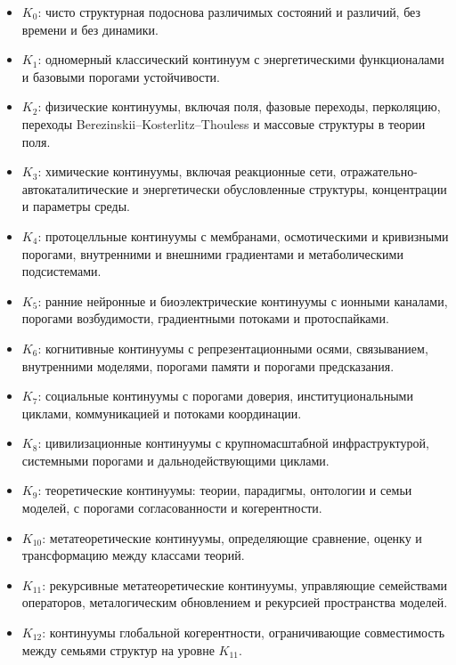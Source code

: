 \begin{itemize}
    \item \(K_0\): чисто структурная подоснова различимых состояний и различий, без времени и без динамики.
    \item \(K_1\): одномерный классический континуум с энергетическими функционалами и базовыми порогами устойчивости.
    \item \(K_2\): физические континуумы, включая поля, фазовые переходы, перколяцию,
          переходы Berezinskii--Kosterlitz--Thouless и массовые структуры в теории поля.
    \item \(K_3\): химические континуумы, включая реакционные сети, отражательно-автокаталитические
          и энергетически обусловленные структуры, концентрации и параметры среды.
    \item \(K_4\): протоцелльные континуумы с мембранами, осмотическими и кривизными порогами,
          внутренними и внешними градиентами и метаболическими подсистемами.
    \item \(K_5\): ранние нейронные и биоэлектрические континуумы с ионными каналами,
          порогами возбудимости, градиентными потоками и протоспайками.
    \item \(K_6\): когнитивные континуумы с репрезентационными осями, связыванием,
          внутренними моделями, порогами памяти и порогами предсказания.
    \item \(K_7\): социальные континуумы с порогами доверия, институциональными циклами,
          коммуникацией и потоками координации.
    \item \(K_8\): цивилизационные континуумы с крупномасштабной инфраструктурой,
          системными порогами и дальнодействующими циклами.
    \item \(K_9\): теоретические континуумы: теории, парадигмы, онтологии и семьи моделей,
          с порогами согласованности и когерентности.
    \item \(K_{10}\): метатеоретические континуумы, определяющие сравнение, оценку и трансформацию между классами теорий.
    \item \(K_{11}\): рекурсивные метатеоретические континуумы, управляющие семействами операторов,
          металогическим обновлением и рекурсией пространства моделей.
    \item \(K_{12}\): континуумы глобальной когерентности, ограничивающие совместимость между
          семьями структур на уровне \(K_{11}\).
\end{itemize}

